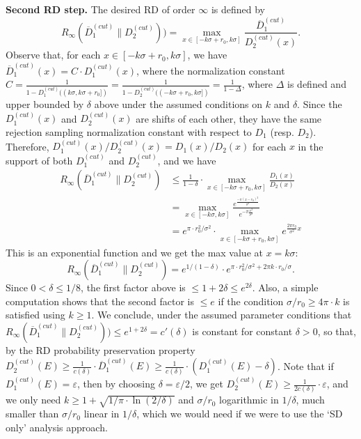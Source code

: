 \textbf{Second RD step.} The desired RD of order $\infty$ is defined by
\[
  R_\infty(\overline{D}_1^{(cut)}\|D_2^{(cut)})) = \max_{x \in
    [-k\sigma+r_0,k\sigma]} \frac{\overline{D}_1^{(cut)}} {D_2^{(cut)}(x)}.
\]
Observe that, for each $x \in [-k\sigma+r_0,k\sigma]$, we have
$\overline{D}_1^{(cut)}(x) = C \cdot D_1^{(cut)}(x)$, where the normalization
constant
$C = \frac{1}{1-D_1^{(cut)}((k\sigma,k\sigma+r_0])} =
\frac{1}{1-D_2^{(cut)}((-k\sigma+r_0,k\sigma])} = \frac{1}{1-\Delta}$, where
$\Delta$ is defined and upper bounded by $\delta$ above under the assumed
conditions on $k$ and $\delta$. Since the $D_1^{(cut)}(x)$ and $D_2^{(cut)}(x)$
are shifts of each other, they have the same rejection sampling normalization
constant with respect to $D_1$ (resp. $D_2$). Therefore,
$D_1^{(cut)}(x)/D_2^{(cut)}(x)=D_1(x)/D_2(x)$ for each $x$ in the support of
both $D_1^{(cut)}$ and $D_2^{(cut)}$, and we have
\begin{align*}
  R_\infty(\overline{D}_1^{(cut)}\|D_2^{(cut)}) &\leq \frac{1}{1-\delta} \cdot \max_{x \in [-k\sigma+r_0,k\sigma]} \frac{D_1(x)}
                                                  {D_2(x)}\\
                                                &= \max_{x \in [-k\sigma,k\sigma]}\frac{e^{\frac{-\pi(x-r_0)^2}{\sigma^2}}}{e^{-\pi\frac{x^2}{\sigma^2}}}
  \\
                                                &= e^{\pi \cdot r_0^2/\sigma^2} \cdot \max_{x \in [-k\sigma+r_0,k\sigma]}e^{\frac{2\pi r_0}
                                                  {\sigma^2}x}
\end{align*}
This is an exponential function and we get the max value at $x = k\sigma$:
$$
R_\infty(\overline{D}_1^{(cut)}\|D_2^{(cut)}) = e^{1/(1-\delta)} \cdot e^{\pi
  \cdot r_0^2/\sigma^2 + 2\pi k \cdot r_0/\sigma}.
$$
Since $0<\delta \leq 1/8$, the first factor above is
$\leq 1+2\delta \leq e^{2\delta}$. Also, a simple computation shows that the
second factor is $\leq e$ if the condition $\sigma/r_0 \geq 4 \pi \cdot k$ is
satisfied using $k \geq 1$. We conclude, under the assumed parameter conditions
that
$R_\infty(\overline{D}_1^{(cut)}\|D_2^{(cut)})) \leq e^{1+2\delta} = c'(\delta)$
is constant for constant $\delta>0$, so that, by the RD probability preservation
property
$D_2^{(cut)}(E) \geq \frac{1}{c(\delta)} \cdot \overline{D}_1^{(cut)}(E) \geq
\frac{1}{c(\delta)} \cdot (D_1^{(cut)}(E) - \delta)$. Note that if
$D_1^{(cut)}(E)=\varepsilon$, then by choosing $\delta = \varepsilon/2$, we get
$D_2^{(cut)}(E) \geq \frac{1}{2c(\delta)} \cdot \varepsilon$, and we only need
$k \geq 1 + \sqrt{1/\pi \cdot \ln(2/\delta)}$ and $\sigma/r_0$ logarithmic in
$1/\delta$, much smaller than $\sigma/r_0$ linear in $1/\delta$, which we would
need if we were to use the `SD only' analysis approach.

